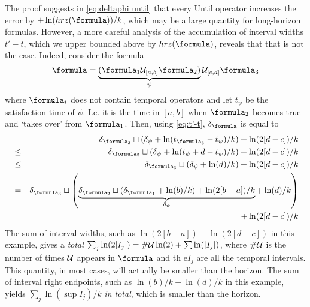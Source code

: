 \begin{rem}
	\label{rem:upper bound}
	The proof suggests in \eqref{eq:deltaphi until} that every Until operator increases the error by $+\ln(hrz(\formula))/k$, which may be a large quantity for long-horizon formulas.
	However, a more careful analysis of the accumulation of interval widths $t'-t$, which we upper bounded above by $hrz(\formula)$, reveals that that is not the case.
	Indeed, consider the formula
	\[\formula = \underbrace{(\formula_1 \until_{[a,b]} \formula_2) }_{\psi}\until_{[c,d]} \formula_3\]
	where $\formula_i$ does not contain temporal operators and let $t_\psi$ be the satisfaction time of $\psi$. 
	I.e. it is the time in $[a,b]$ when $\formula_2$ becomes true and `takes over' from $\formula_1$.
	Then, using \eqref{eq:t'-t}, $\delta_{\formula}$ is equal to
	\begin{eqnarray*}
	 && \delta_{\formula_3} \sqcup ( \delta_{\psi} + \ln(t_{\formula_3} - t_\psi)/k )+ \ln(2[d-c])/k 
	\\
	&\leq& \delta_{\formula_3} \sqcup ( \delta_{\psi} + \ln(t_\psi + d - t_\psi)/k )+ \ln(2[d-c])/k 
	\\
	&\leq& \delta_{\formula_3} \sqcup ( \delta_{\psi} + \ln(d)/k )+ \ln(2[d-c])/k 
	\\
	&=& \delta_{\formula_3} \sqcup \left( \underbrace{\delta_{\formula_2} \sqcup ( \delta_{\formula_1} + \ln(b)/k )+ \ln(2[b-a])/k }_{\delta_\psi} + \ln(d)/k \right)
	\\
	&& \quad + \ln(2[d-c])/k 
	\end{eqnarray*}
	The sum of interval widths, such as $\ln(2[b-a])+\ln(2[d-c])$ in this example, gives a \textit{total} $\sum_j\ln(2|I_j|) = \#\mathcal{U}\ln(2) +  \sum\ln(|I_j|)$, where $\#\mathcal{U}$ is the number of times $\mathcal{U}$ appears in $\formula$ and th e$I_j$ are all the temporal intervals. 
	This quantity, in most cases, will actually be smaller than the horizon.
	The sum of interval right endpoints, such as $\ln(b)/k + \ln(d)/k$ in this example, yields $\sum_j \ln(\sup I_j)/k$ \textit{in total}, which is smaller than the horizon.
\end{rem}